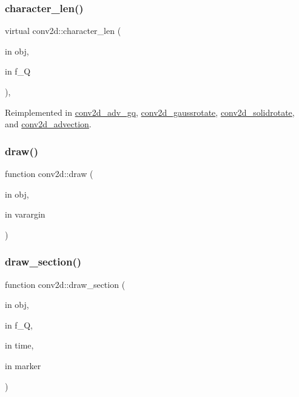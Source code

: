 \subsubsection{\texorpdfstring{character\+\_\+len()}{character\_len()}}
{\footnotesize\ttfamily virtual conv2d\+::character\+\_\+len (\begin{DoxyParamCaption}\item[{in}]{obj,  }\item[{in}]{f\+\_\+Q }\end{DoxyParamCaption})\hspace{0.3cm}{\ttfamily [protected]}, {\ttfamily [virtual]}}



Reimplemented in \hyperlink{classconv2d__adv__gq_ae66fb4e5a223c63241e5b3a94794f318}{conv2d\+\_\+adv\+\_\+gq}, \hyperlink{classconv2d__gaussrotate_a455e3b10962c29d1a5e19eaaf27ee8c0}{conv2d\+\_\+gaussrotate}, \hyperlink{classconv2d__solidrotate_a8d420c4ad2c355f51205e576cf2e158c}{conv2d\+\_\+solidrotate}, and \hyperlink{classconv2d__advection_a1bd7fcd5523489945e7294630043de7e}{conv2d\+\_\+advection}.

\mbox{\label{classconv2d_abd3af15cff04302f73d06d04e45d86d6}} 
\subsubsection{\texorpdfstring{draw()}{draw()}}
{\footnotesize\ttfamily function conv2d\+::draw (\begin{DoxyParamCaption}\item[{in}]{obj,  }\item[{in}]{varargin }\end{DoxyParamCaption})}

\mbox{\label{classconv2d_aede7eb109a5c42b70fabf370699790ef}} 
\subsubsection{\texorpdfstring{draw\+\_\+section()}{draw\_section()}}
{\footnotesize\ttfamily function conv2d\+::draw\+\_\+section (\begin{DoxyParamCaption}\item[{in}]{obj,  }\item[{in}]{f\+\_\+Q,  }\item[{in}]{time,  }\item[{in}]{marker }\end{DoxyParamCaption})}

